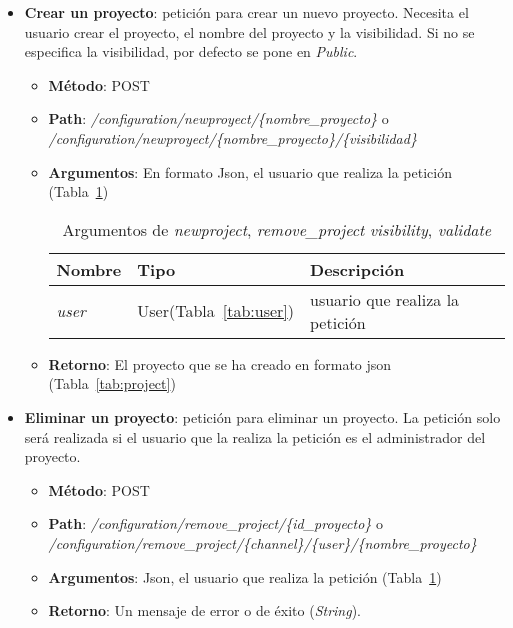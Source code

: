 \begin{itemize}
\item \textbf{Crear un proyecto}: petición para crear un nuevo proyecto. Necesita el usuario crear el proyecto, el nombre del proyecto y la visibilidad. Si no se especifica la visibilidad, por defecto se pone en \textit{Public}.
	\begin{itemize}
	\item \textbf{Método}: POST
	\item \textbf{Path}: \textit{/configuration/newproyect/\{nombre\_proyecto\}} o\\ \textit{/configuration/newproyect/\{nombre\_proyecto\}/\{visibilidad\}}
	\item \textbf{Argumentos}: En formato Json, el usuario que realiza la petición (Tabla~\ref{tab:newproject})\\
		\begin{table}[h]
		\centering
		
		\begin{tabular}{lll}
		\textbf{Nombre}  & \textbf{Tipo} & \textbf{Descripción}                                 \\ \hline \hline
		\textit{user} & User(Tabla~\ref{tab:user}) & usuario que realiza la petición\\ \hline
		\end{tabular}
		\caption{Argumentos de \textit{newproject}, \textit{remove\_project} \textit{visibility}, \textit{validate}}
		\label{tab:newproject}
		\end{table}
	\item \textbf{Retorno}: El proyecto que se ha creado en formato json (Tabla~\ref{tab:project})
	\end{itemize}
\item \textbf{Eliminar un proyecto}: petición para eliminar un proyecto. La petición solo será realizada si el usuario que la realiza la petición es el administrador del proyecto. 
	\begin{itemize}
	\item \textbf{Método}: POST
	\item \textbf{Path}: \textit{/configuration/remove\_project/\{id\_proyecto\}} o\\ \textit{/configuration/remove\_project/\{channel\}/\{user\}/\{nombre\_proyecto\}}
	\item \textbf{Argumentos}: Json, el usuario que realiza la petición (Tabla~\ref{tab:newproject})
	\item \textbf{Retorno}: Un mensaje de error o de éxito (\textit{String}).
	\end{itemize}
	

\end{itemize}
